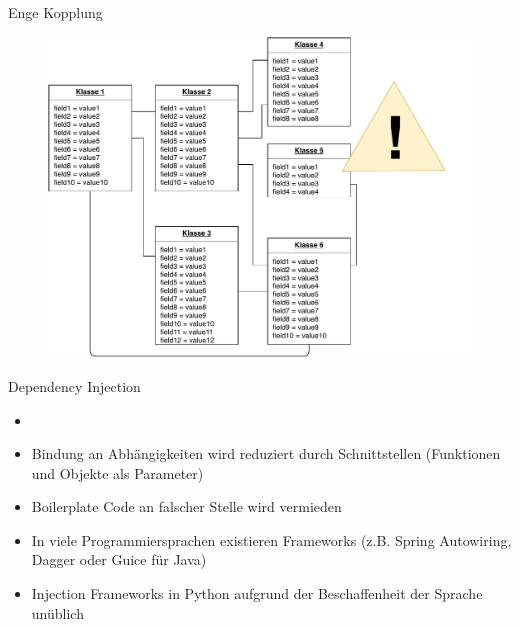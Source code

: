 \begin{frame}{Enge Kopplung}
    	  \begin{figure}[!htb]
        \includegraphics[scale=0.5]{6-python3/img/tightcoupling}  
    \end{figure}
\end{frame}


\begin{frame}{Dependency Injection}
 \begin{itemize}
        \setlength{\itemindent}{1.3in}
        \item [\textbf{Dependency Injection}]
    \end{itemize}

    \begin{itemize}
        \item Bindung an Abhängigkeiten wird reduziert durch Schnittstellen (Funktionen und Objekte als Parameter)
        \item Boilerplate Code an falscher Stelle wird vermieden
        \item In viele Programmiersprachen existieren Frameworks (z.B. Spring Autowiring, Dagger oder Guice für Java) 
        \item Injection Frameworks in Python aufgrund der Beschaffenheit der Sprache unüblich
   \end{itemize}
   
\end{frame}


